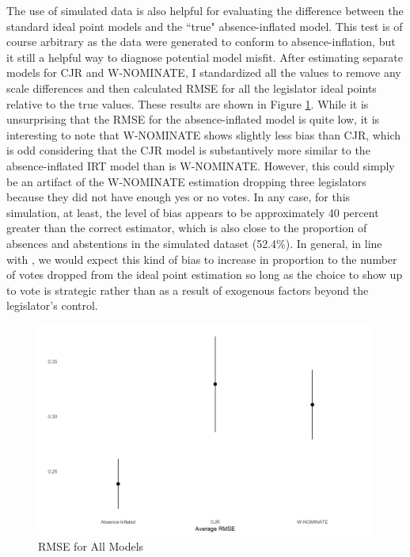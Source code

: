 	The use of simulated data is also helpful for evaluating the difference between the standard ideal point models and the ``true" absence-inflated model. This test is of course arbitrary as the data were generated to conform to absence-inflation, but it still a helpful way to diagnose potential model misfit. After estimating separate models for CJR and W-NOMINATE, I standardized all the values to remove any scale differences and then calculated RMSE for all the legislator ideal points relative to the true values. These results are shown in Figure \ref{sim_rmse}. While it is unsurprising that the RMSE for the absence-inflated model is quite low, it is interesting to note that W-NOMINATE shows slightly less bias than CJR, which is odd considering that the CJR model is substantively more similar to the absence-inflated IRT model than is W-NOMINATE. However, this could simply be an artifact of the W-NOMINATE estimation dropping three legislators because they did not have enough yes or no votes. In any case, for this simulation, at least, the level of bias appears to be approximately 40 percent greater than the correct estimator, which is also close to the proportion of absences and abstentions in the simulated dataset (52.4\%). In general, in line with \textcite{rosas2015}, we would expect this kind of bias to increase in proportion to the number of votes dropped from the ideal point estimation so long as the choice to show up to vote is strategic rather than as a result of exogenous factors beyond the legislator's control.
	
	\begin{figure}
		\caption{RMSE for All Models}\label{sim_rmse}
		\includegraphics[width=\linewidth]{sim_rmse_allmods}
	\end{figure} 
	
